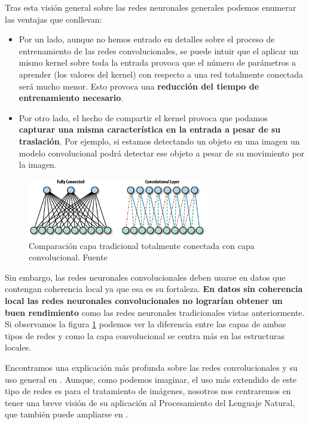 Tras esta visión general sobre las redes neuronales generales podemos enumerar las ventajas que conllevan: 

\begin{itemize}
	\item Por un lado, aunque no hemos entrado en detalles sobre el proceso de entrenamiento de las redes convolucionales, se puede intuir que el aplicar un mismo kernel sobre toda la entrada provoca que el número de parámetros a aprender (los valores del kernel) con respecto a una red totalmente conectada será mucho menor. Esto provoca una \textbf{reducción del tiempo de entrenamiento necesario}. 
	\item Por otro lado, el hecho de compartir el kernel provoca que podamos \textbf{capturar una misma característica en la entrada a pesar de su traslación}. Por ejemplo, si estamos detectando un objeto en una imagen un modelo convolucional podrá detectar ese objeto a pesar de su movimiento por la imagen. 
\end{itemize}


\begin{figure}[!ht]
	\centering
	\includegraphics[width=0.7\textwidth]{images/arte/traditionalvscnn}
	\caption{Comparación capa tradicional totalmente conectada con capa convolucional. Fuente \cite{hope_lieder_resheff_2017}}
	\label{fig:tradvscnn}
\end{figure}



Sin embargo, las redes neuronales convolucionales deben usarse en datos que contengan coherencia local ya que esa es su fortaleza. \textbf{En datos sin coherencia local las redes neuronales convolucionales no lograrían obtener un buen rendimiento} como las redes neuronales tradicionales vistas anteriormente. Si observamos la figura \ref{fig:tradvscnn} podemos ver la diferencia entre las capas de ambas tipos de redes y como la capa convolucional se centra más en las estructuras locales.




Encontramos una explicación más profunda sobre las redes convolucionales y su uso general en \cite{temariodeeplearning}. Aunque, como podemos imaginar, el uso más extendido de este tipo de redes es para el tratamiento de imágenes, nosotros nos centraremos en tener una breve visión de su aplicación al Procesamiento del Lenguaje Natural, que también puede ampliarse en \cite{goldberg_2017}.



